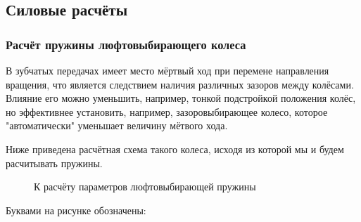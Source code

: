 \documentclass[14pt,a4paper,russian]{scrartcl}
\begin{document}
    
\subsection{Силовые расчёты}
    \subsubsection{Расчёт пружины люфтовыбирающего колеса}
        В зубчатых передачах имеет место мёртвый ход при перемене направления вращения,
        что является следствием наличия различных зазоров между колёсами. Влияние его можно уменьшить,
        например, тонкой подстройкой положения колёс, но эффективнее установить, например, зазоровыбирающее
        колесо, которое "автоматически" уменьшает величину мётвого хода.\par
        Ниже приведена расчётная схема такого колеса, исходя из которой мы и будем расчитывать пружины.\par
        \begin{figure}[h]
            \caption{К расчёту параметров люфтовыбирающей пружины}
        \end{figure}
        Буквами на рисунке обозначены:
\end{document}
